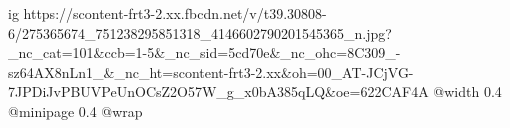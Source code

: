  
 
 
 
 

\ifcmt
  ig https://scontent-frt3-2.xx.fbcdn.net/v/t39.30808-6/275365674_751238295851318_4146602790201545365_n.jpg?_nc_cat=101&ccb=1-5&_nc_sid=5cd70e&_nc_ohc=8C309_-sz64AX8nLn1_&_nc_ht=scontent-frt3-2.xx&oh=00_AT-JCjVG-7JPDiJvPBUVPeUnOCsZ2O57W_g_x0bA385qLQ&oe=622CAF4A
  @width 0.4
  @minipage 0.4
  @wrap \parpic[r]
\fi
